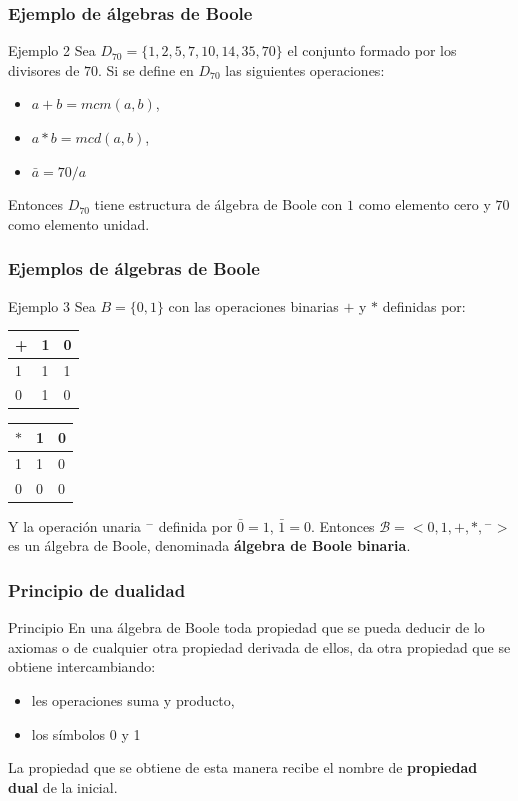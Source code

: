 \documentclass{beamer}
\begin{document}
\begin{frame}
\frametitle{Ejemplo de \'algebras de Boole}
\begin{block}{Ejemplo 2}
Sea $D_{70} = \{1,2,5,7,10,14,35,70\}$ el conjunto formado por los divisores de $70$. Si se define en $D_{70}$ las siguientes operaciones: 
\begin{itemize}
\item $a+b = mcm(a,b)$, 
\item $a*b = mcd(a,b)$,
\item $\bar{a} = 70/a$ 
\end{itemize}
Entonces $D_{70}$ tiene estructura de \'algebra de Boole con $1$ como elemento cero y $70$ como elemento unidad.
\end{block}
\end{frame}




\begin{frame}
\frametitle{Ejemplos de \'algebras de Boole}
\begin{block}{Ejemplo 3}
Sea $B= \{0,1\}$ con las operaciones binarias $+$ y $*$ definidas por:  

\begin{multicols}{2}
\begin{tabular}{ |p{1cm}|p{0.8cm}|p{0.8cm}|  }
 \hline
+&1&0 \\
 \hline
 1&1&1 \\
0 & 1 &  0 \\
 \hline
\end{tabular}


\begin{tabular}{ |p{1cm}|p{0.8cm}|p{0.8cm}|  }
 \hline
$*$&1&0 \\
 \hline
 1&1&0 \\
0 & 0 &  0 \\
 \hline
\end{tabular}
\end{multicols}
Y la operaci\'on unaria ${}^-$ definida por $\bar{0} = 1$, $\bar{1} = 0$. Entonces $\mathcal{B} = <0,1,+,*,{}^->$ es un \'algebra de Boole, denominada \textbf{\'algebra de Boole binaria}.

\end{block}
\end{frame}


\begin{frame}
\frametitle{Principio de dualidad}
\begin{block}{Principio}
En una \'algebra de Boole toda propiedad que se pueda deducir de lo axiomas o de cualquier otra propiedad derivada de ellos, da otra propiedad que se obtiene intercambiando:
\begin{itemize}
\item les operaciones suma y producto, 
\item los s\'imbolos 0 y 1
\end{itemize}
La propiedad que se obtiene de esta manera recibe el nombre de \textbf{propiedad dual} de la inicial.
\end{block}

\end{frame}
\end{document}
